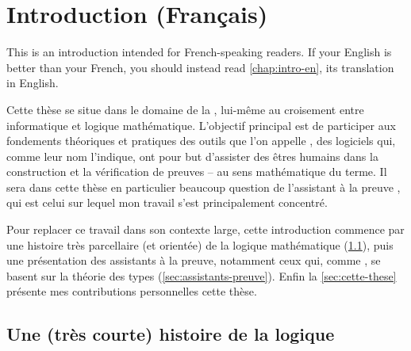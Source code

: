 \chapter{Introduction (Français)}
\label{chap:intro-fr}

\margintoc

\begin{kaobox}[backgroundcolor=Black!10!White,frametitlebackgroundcolor=Black!10!White]
  This  is an introduction intended for French-speaking readers.
  If your English is better than your French,
  you should instead read \cref{chap:intro-en}, its translation in English.
\end{kaobox}


Cette thèse se situe dans le domaine de la , lui-même au croisement entre informatique et logique mathématique.
L’objectif principal est de participer aux fondements théoriques et pratiques des outils
que l’on appelle , des logiciels qui, comme leur nom
l’indique, ont pour but d’assister des êtres humains dans la construction
et la vérification de preuves – au sens mathématique du terme. Il sera dans cette thèse
en particulier beaucoup question de l’assistant à la preuve , qui est celui
sur lequel mon travail s’est principalement concentré.

Pour replacer ce travail dans son contexte large, cette introduction commence par une histoire très parcellaire (et orientée) de la logique mathématique
(\cref{sec:logique-histoire}),
puis une présentation des assistants à la preuve,
notamment ceux qui, comme , se basent sur la théorie des types (\cref{sec:assistants-preuve}). Enfin la \cref{sec:cette-these} présente
mes contributions personnelles cette thèse.

\section{Une (très courte) histoire de la logique}
\label{sec:logique-histoire}

